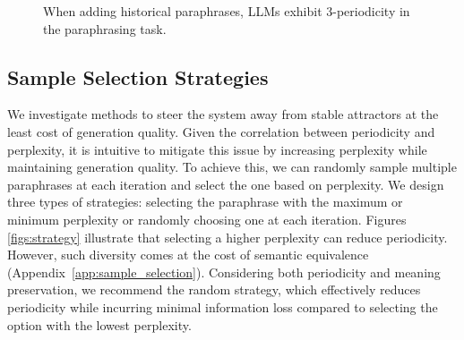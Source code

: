 \label{sec:history}
\begin{figure}[!h]
    \centering
    \caption{When adding historical paraphrases, LLMs exhibit 3-periodicity in the paraphrasing task.}    
    \label{figs:3-periodicity}
\end{figure}


\subsection{Sample Selection Strategies}

\label{sec:sampling_strat}






We investigate methods to steer the system away from stable attractors at the least cost of generation quality. 
Given the correlation between periodicity and perplexity, it is intuitive to mitigate this issue by increasing perplexity while maintaining generation quality.
To achieve this, we can randomly sample multiple paraphrases at each iteration and select the one based on perplexity.
We design three types of strategies: selecting the paraphrase with the maximum or minimum perplexity or randomly choosing one at each iteration.
Figures \ref{figs:strategy} illustrate that selecting a higher perplexity can reduce periodicity.
However, such diversity comes at the cost of semantic equivalence (Appendix~\ref{app:sample_selection}).
Considering both periodicity and meaning preservation, we recommend the random strategy, which effectively reduces periodicity while incurring minimal information loss compared to selecting the option with the lowest perplexity.


